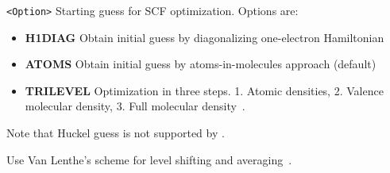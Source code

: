 \begin{description}
\verb|<Option>|\newline
Starting guess for SCF optimization. Options are:
\begin{itemize}
\item {\bf H1DIAG} Obtain initial guess by diagonalizing one-electron Hamiltonian
\item {\bf ATOMS}  Obtain initial guess by atoms-in-molecules approach (default)
\item {\bf TRILEVEL} Optimization in three steps. 1. Atomic densities, 2. Valence molecular density, 3. Full molecular density~\cite{trilevel1, trilevel2}. 
\end{itemize}
Note that Huckel guess is not supported by \lsdalton.
\item[\Key{VanLenthe}] Use Van Lenthe's scheme for level shifting and averaging~\cite{VanLenthe}.


\end{description}
